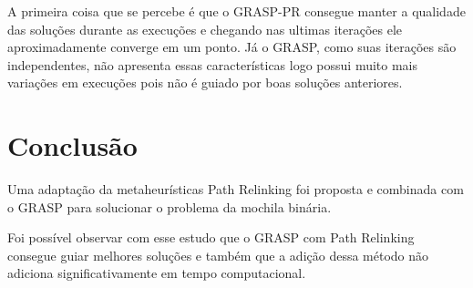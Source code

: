 \documentclass[11pt]{article}
\begin{document}
A primeira coisa que se percebe é que o GRASP-PR consegue manter a qualidade das soluções durante as execuções e chegando nas ultimas iterações ele aproximadamente converge em um ponto. Já o GRASP, como suas iterações são independentes, não apresenta essas características logo possui muito mais variações em execuções pois não é guiado por boas soluções anteriores.


\section{Conclusão}
\label{sec:orgdaf2bf9}
Uma adaptação da metaheurísticas Path Relinking foi proposta e combinada com o GRASP para solucionar o problema da mochila binária.

Foi possível observar com esse estudo que o GRASP com Path Relinking consegue guiar melhores soluções e também que a adição dessa método não adiciona significativamente em tempo computacional.
\end{document}
